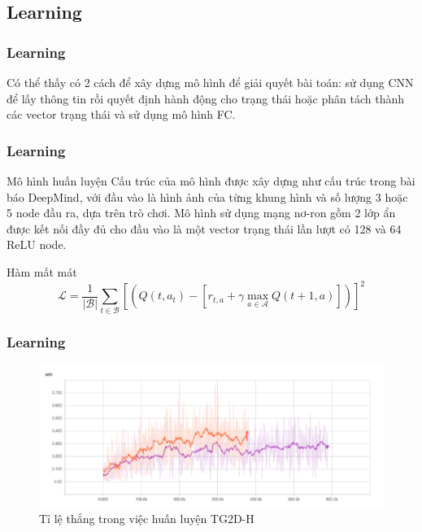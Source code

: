 \documentclass{beamer}
\begin{document}
\subsection{Learning}
\begin{frame}
\frametitle{Learning}
Có thể thấy có 2 cách để xây dựng mô hình để giải quyết bài toán: sử dụng CNN để lấy thông tin rồi quyết định hành động cho trạng thái hoặc phân tách thành các vector trạng thái  và sử dụng mô hình FC.
\end{frame}
\begin{frame}
\frametitle{Learning}
\begin{block}{Mô hình huấn luyện}
Cấu trúc của mô hình được xây dựng như cấu trúc trong bài báo DeepMind, với đầu vào là hình ảnh của từng khung hình và số lượng 3 hoặc 5 node đầu ra, dựa trên trò chơi. Mô hình sử dụng mạng nơ-ron gồm 2 lớp ẩn được kết nối đầy đủ cho đầu vào là một vector trạng thái lần lượt có 128 và 64 ReLU node.\\
\end{block}
\begin{block}{Hàm mất mát}
\[\mathcal{L} = \dfrac{1}{|\mathcal{B}|}\sum_{t\in \mathcal{B}}\left[\left(Q(t,a_t) - \left[r_{t,a} + \gamma \max_{a\in \mathcal{A}} Q(t+1,a)\right]\right)\right]^2\]
\end{block}
\end{frame}

\begin{frame}
\frametitle{Learning}
\begin{figure}[t]
    \centering
    \includegraphics{photo/2model.png}
    \caption{Tỉ lệ thắng trong việc huấn luyện TG2D-H}
    \label{fig:my_label}
\end{figure}
\end{frame}
\end{document}
